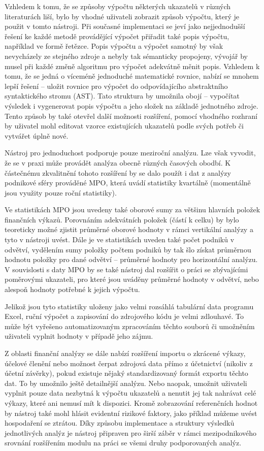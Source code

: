Vzhledem k tomu, že se způsoby výpočtu některých ukazatelů v různých literaturách liší, bylo by vhodné uživateli zobrazit způsob výpočtu, který je použit v tomto nástroji. Při současné implementaci se jeví jako nejjednodušší řešení ke každé metodě provádějící výpočet přiřadit také popis výpočtu, například ve formě řetězce. Popis výpočtu a výpočet samotný by však nevycházely ze stejného zdroje a nebyly tak sémanticky propojeny, vývojář by musel při každé změně algoritmu pro výpočet adekvátně měnit popis. Vzhledem k tomu, že se jedná o víceméně jednoduché matematické rovnice, nabízí se mnohem lepší řešení -- uložit rovnice pro výpočet do odpovídajícího abstraktního syntaktického stromu (AST). Tato struktura by umožnila obojí -- vypočítat výsledek i vygenerovat popis výpočtu a jeho složek na základě jednotného zdroje. Tento způsob by také otevřel další možnosti rozšíření, pomocí vhodného rozhraní by uživatel mohl editovat vzorce existujících ukazatelů podle svých potřeb či vytvářet úplně nové.

Nástroj pro jednoduchost podporuje pouze meziroční analýzu. Lze však vyvodit, že se v praxi může provádět analýza obecně různých časových obodbí. K částečnému zkvalitnění tohoto rozšíření by se dalo použít i dat z analýzy podnikové sféry prováděné MPO, která uvádí statistiky kvartálně (momentálně jsou využity pouze roční statistiky).

Ve statistikách MPO jsou uvedeny také oborové sumy za většinu hlavních položek finančních výkazů. Porovnáním adekvátních položek (částí k celku) by bylo teoreticky možné zjistit průměrné oborové hodnoty v rámci vertikální analýzy a tyto v nástroji uvést. Dále je ve statistikách uveden také počet podniků v odvětví, vydělením sumy položky počtem podniků by tak šlo získat průměrnou hodnotu položky pro dané odvětví -- průměrné hodnoty pro horizontální analýzu. V souvislosti s daty MPO by se také nástroj dal rozšířit o práci se zbývajícími poměrovými ukazateli, pro které jsou uváděny průměrné hodnoty v odvětví, nebo alespoň hodnoty potřebné k jejich výpočtu.

Jelikož jsou tyto statistiky uloženy jako velmi rozsáhlá tabulární data programu Excel, ruční výpočet a zapisování do zdrojového kódu je velmi zdlouhavé. To může být vyřešeno automatizovaným zpracováním těchto souborů či umožněním uživateli vyplnit hodnoty v případě jeho zájmu.

Z oblasti finanční analýzy se dále nabízí rozšíření importu o zkrácené výkazy, účelové členění nebo možnost čerpat zdrojová data přímo z účetnictví (nikoliv z účetní závěrky), pokud existuje nějaký standardizovaný formát exportu těchto dat. To by umožnilo ještě detailnější analýzu. Nebo naopak, umožnit uživateli vyplnit pouze data nezbytná k výpočtu ukazatelů a nenutit jej tak nahrávat celé výkazy, které ani nemusí mít k dispozici. Kromě zobrazování referenčních hodnot by nástroj také mohl hlásit evidentní rizikové faktory, jako příklad můžeme uvést hospodaření se ztrátou. Díky způsobu implementace a struktury výsledků jednotlivých analýz je nástroj připraven pro širší záběr v rámci mezipodnikového srovnání rozšířením modulu na práci se všemi druhy podporovaných analýz.



